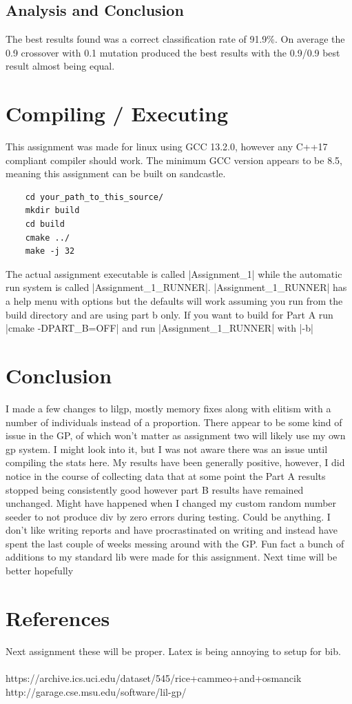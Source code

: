 \documentclass[]{report}
\begin{document}
\subsection{Analysis and Conclusion}
The best results found was a correct classification rate of 91.9\%. On average the 0.9 crossover with 0.1 mutation produced the best results with the 0.9/0.9 best result almost being equal.


\section{Compiling / Executing}
This assignment was made for linux using GCC 13.2.0, however any C++17 compliant compiler should work. 
The minimum GCC version appears to be 8.5, meaning this assignment can be built on sandcastle.
\begin{lstlisting}
	cd your_path_to_this_source/
	mkdir build
	cd build
	cmake ../
	make -j 32
\end{lstlisting}
The actual assignment executable is called |Assignment_1| while the automatic run system is called |Assignment_1_RUNNER|. |Assignment_1_RUNNER| has a help menu with options but the defaults will work assuming you run from the build directory and are using part b only. If you want to build for Part A run |cmake -DPART_B=OFF| and run |Assignment_1_RUNNER| with |-b|

\section{Conclusion}
I made a few changes to lilgp, mostly memory fixes along with elitism with a number of individuals instead of a proportion. There appear to be some kind of issue in the GP, of which won't matter as assignment two will likely use my own gp system. I might look into it, but I was not aware there was an issue until compiling the stats here. My results have been generally positive, however, I did notice in the course of collecting data that at some point the Part A results stopped being consistently good however part B results have remained unchanged. Might have happened when I changed my custom random number seeder to not produce div by zero errors during testing. Could be anything. I don't like writing reports and have procrastinated on writing and instead have spent the last couple of weeks messing around with the GP. Fun fact a bunch of additions to my standard lib were made for this assignment. Next time will be better hopefully

\section{References}
Next assignment these will be proper. Latex is being annoying to setup for bib.\\\\
https://archive.ics.uci.edu/dataset/545/rice+cammeo+and+osmancik\\
http://garage.cse.msu.edu/software/lil-gp/
\end{document}
